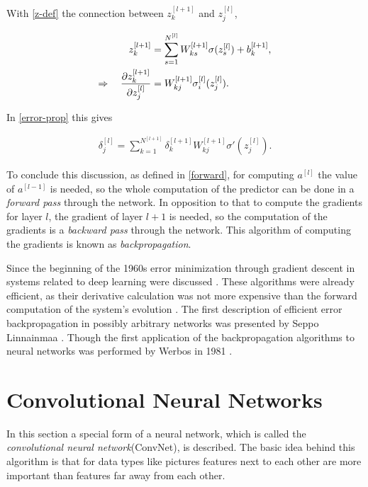 \documentclass[12pt, a4paper]{thesis}
\begin{document}
With \eqref{z-def} the connection between \(z_{k}^{[l+1]}\) and
\(z_{j}^{[l]}\),

\begin{align}
  z^{[l+1]}_{k} &= \sum_{s=1}^{N^{[l]}} W^{[l+1]}_{ks}
  \sigma(z^{[l]}_{s}) + b^{[l+1]}_{k}, \\ \Rightarrow \quad
  \pdv{z_{k}^{[l+1]}}{z_{j}^{[l]}} &= W^{[l+1]}_{kj}
  \sigma^{[l]}_{i}(z^{[l]}_{j}).
\end{align}

In \eqref{error-prop} this gives

\begin{align}
  \delta^{[l]}_{j} = \sum^{N^{[l+1]}}_{k=1} \delta^{[l+1]}_{k}
  W^{[l+1]}_{kj} \sigma'(z^{[l]}_{j}).
\end{align}

To conclude this discussion, as defined in \eqref{forward}, for
computing \(a^{[l]}\) the value of \(a^{[l-1]}\) is needed, so the
whole computation of the predictor can be done in a \emph{forward
  pass} through the network. In opposition to that to compute the
gradients for layer \(l\), the gradient of layer \(l+1\) is needed, so
the computation of the gradients is a \emph{backward pass} through the
network.  This algorithm of computing the gradients is known as
\emph{backpropagation}.

Since the beginning of the 1960s error minimization through gradient
descent in systems related to deep learning were discussed
\cite{Kelley1960,bryson1961,BRYSON-DENHAM-61A,PONTRYAGIN61A,dreyfus1962,Wilkinson1965,Amari1967TAP,bryson1969applied}.
These algorithms were already efficient, as their derivative
calculation was not more expensive than the forward computation of the
system's evolution \cite{schmidhuber15_deep_learn_neural_networ}.  The
first description of efficient error backpropagation in possibly
arbitrary networks was presented by Seppo Linnainmaa
\cite{Linnainmaa:1970,Linnainmaa:1976}. Though the first application
of the backpropagation algorithms to neural networks was performed by
Werbos in 1981 \cite{Werbos:81sensitivity}.

\section{Convolutional Neural Networks}
\label{sec:orgf8e2395}

In this section a special form of a neural network, which is called
the \emph{convolutional neural network}(ConvNet), is described. The
basic idea behind this algorithm is that for data types like pictures
features next to each other are more important than features far away
from each other.
\end{document}

